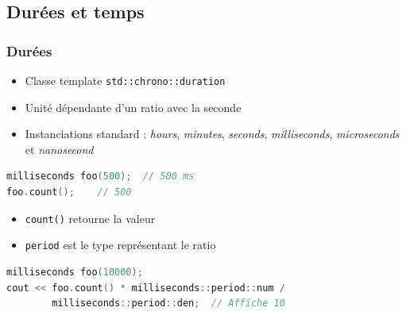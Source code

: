 \documentclass[C++.tex]{subfiles}
\begin{document}
\subsection*{Durées et temps}
\begin{frame}[fragile]
	\frametitle{Durées}
	\begin{itemize}
		\item Classe template \lstinline|std::chrono::duration|
		\item Unité dépendante d'un ratio avec la seconde
		\item Instanciations standard : \textit{hours}, \textit{minutes}, \textit{seconds}, \textit{milliseconds}, \textit{microseconds} et \textit{nanosecond}
	\end{itemize}

	\begin{lstlisting}[language=C++]
milliseconds foo(500);  // 500 ms
foo.count();    // 500\end{lstlisting}

	\begin{itemize}
		\item \lstinline|count()| retourne la valeur
		\item \lstinline|period| est le type représentant le ratio
	\end{itemize}

	\begin{lstlisting}[language=C++]
milliseconds foo(10000);
cout << foo.count() * milliseconds::period::num / 
        milliseconds::period::den;  // Affiche 10\end{lstlisting}
\end{frame}
\end{document}
